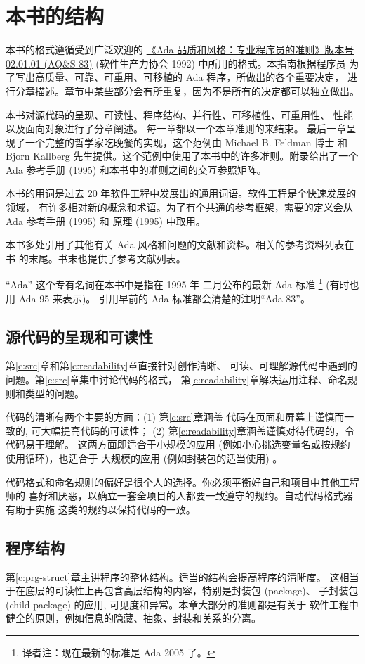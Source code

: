 \section{本书的结构}
本书的格式遵循受到广泛欢迎的
\href{http://archive.adaic.com/docs/style-guide/83style/html/}
{《Ada 品质和风格：专业程序员的准则》版本号
 02.01.01 (AQ\&S 83)} (软件生产力协会 1992) 中所用的格式。本指南根据程序员
为了写出高质量、可靠、可重用、可移植的 Ada 程序，所做出的各个重要决定，
进行分章描述。章节中某些部分会有所重复，因为不是所有的决定都可以独立做出。

本书对源代码的呈现、可读性、程序结构、并行性、可移植性、可重用性、
性能以及面向对象进行了分章阐述。 每一章都以一个本章准则的来结束。
最后一章呈现了一个完整的哲学家吃晚餐的实现，这个范例由 Michael B. Feldman 博士
和 Bjorn Kallberg 先生提供。这个范例中使用了本书中的许多准则。附录给出了一个
Ada 参考手册 (1995) 和本书中的准则之间的交互参照矩阵。

本书的用词是过去 20 年软件工程中发展出的通用词语。软件工程是个快速发展的领域，
有许多相对新的概念和术语。为了有个共通的参考框架，需要的定义会从 Ada 参考手册
(1995) 和 原理 (1995) 中取用。

本书多处引用了其他有关 Ada 风格和问题的文献和资料。相关的参考资料列表在书
的末尾。书末也提供了参考文献列表。

``Ada'' 这个专有名词在本书中是指在 1995 年 二月公布的最新 Ada 标准
\footnote{译者注：现在最新的标准是 Ada 2005 了。} (有时也用 Ada 95 来表示)。
引用早前的 Ada 标准都会清楚的注明``Ada 83''。

\subsection{源代码的呈现和可读性}
第\ref{c:src}章和第\ref{c:readability}章直接针对创作清晰、
可读、可理解源代码中遇到的问题。第\ref{c:src}章集中讨论代码的格式，
第\ref{c:readability}章解决运用注释、命名规则和类型的问题。

代码的清晰有两个主要的方面：(1) 第\ref{c:src}章涵盖
代码在页面和屏幕上谨慎而一致的, 可大幅提高代码的可读性；
(2) 第\ref{c:readability}章涵盖谨慎对待代码的，令代码易于理解。
这两方面即适合于小规模的应用 (例如小心挑选变量名或按规约使用循环)，也适合于
大规模的应用 (例如封装包的适当使用) 。

代码格式和命名规则的偏好是很个人的选择。你必须平衡好自己和项目中其他工程师的
喜好和厌恶，以确立一套全项目的人都要一致遵守的规约。自动代码格式器有助于实施
这类的规约以保持代码的一致。

\subsection{程序结构}
第\ref{c:prg-struct}章主讲程序的整体结构。适当的结构会提高程序的清晰度。
这相当于在底层的可读性上再包含高层结构的内容，特别是封装包 (package)、
子封装包 (child package) 的应用, 可见度和异常。本章大部分的准则都是有关于
软件工程中健全的原则，例如信息的隐藏、抽象、封装和关系的分离。

